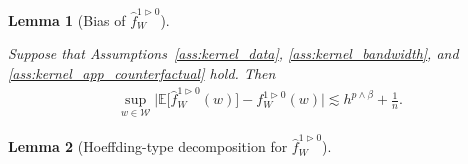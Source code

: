 \documentclass[11pt,lof]{puthesis}
\newcommand{\E}{\ensuremath{\mathbb{E}}}
\newcommand{\cW}{\ensuremath{\mathcal{W}}}
\theoremstyle{break}
\newtheorem{lemma}{Lemma}[section]
\theoremstyle{proof}
\begin{document}
\begin{lemma}[Bias of $\hat f_W^{1 \triangleright 0}$]
\label{lem:kernel_app_counterfactual_bias}

Suppose that Assumptions~\ref{ass:kernel_data},
\ref{ass:kernel_bandwidth}, and \ref{ass:kernel_app_counterfactual} hold.
Then
%
\begin{align*}
\sup_{w \in \cW}
\big|
\E\big[\hat f_W^{1 \triangleright 0}(w)\big]
- f_W^{1 \triangleright 0}(w)
\big|
\lesssim
h^{p \wedge \beta} + \frac{1}{n}.
\end{align*}

\end{lemma}

\begin{lemma}[Hoeffding-type decomposition for
$\hat f_W^{1 \triangleright 0}$]
\label{lem:kernel_app_counterfactual_hoeffding}


\end{lemma}
\end{document}
